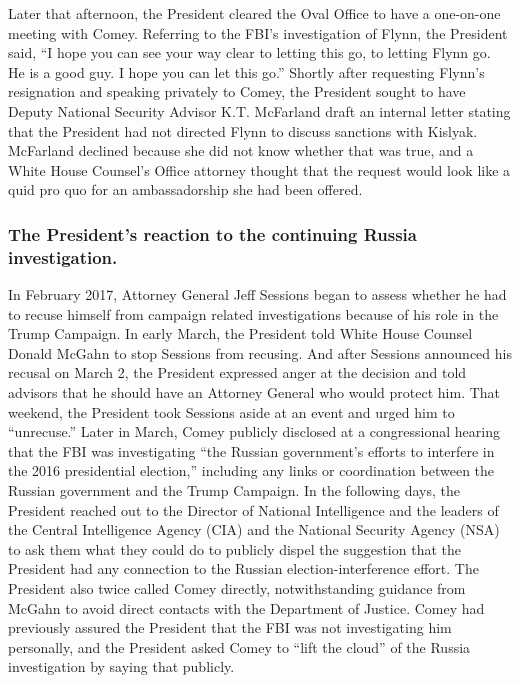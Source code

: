 Later that afternoon, the President cleared the Oval Office to have a one-on-one meeting with Comey.
Referring to the FBI’s investigation of Flynn, the President said, “I hope you can see your way clear to letting this go, to letting Flynn go.
He is a good guy.
I hope you can let this go.”
Shortly after requesting Flynn’s resignation and speaking privately to Comey, the President sought to have Deputy National Security Advisor K.T. McFarland draft an internal letter stating that the President had not directed Flynn to discuss sanctions with Kislyak.
McFarland declined because she did not know whether that was true, and a White House Counsel’s Office attorney thought that the request would look like a quid pro quo for an ambassadorship she had been offered.

\subsubsection*{The President’s reaction to the continuing Russia investigation.}

In February 2017, Attorney General Jeff Sessions began to assess whether he had to recuse himself from campaign related investigations because of his role in the Trump Campaign.
In early March, the President told White House Counsel Donald McGahn to stop Sessions from recusing.
And after Sessions announced his recusal on March 2, the President expressed anger at the decision and told advisors that he should have an Attorney General who would protect him.
That weekend, the President took Sessions aside at an event and urged him to “unrecuse.”
Later in March, Comey publicly disclosed at a congressional hearing that the FBI was investigating “the Russian government’s efforts to interfere in the 2016 presidential election,” including any links or coordination between the Russian government and the Trump Campaign.
In the following days, the President reached out to the Director of National Intelligence and the leaders of the Central Intelligence Agency (CIA) and the National Security Agency (NSA) to ask them what they could do to publicly dispel the suggestion that the President had any connection to the Russian election-interference effort.
The President also twice called Comey directly, notwithstanding guidance from McGahn to avoid direct contacts with the Department of Justice.
Comey had previously assured the President that the FBI was not investigating him personally, and the President asked Comey to “lift the cloud” of the Russia investigation by saying that publicly.

